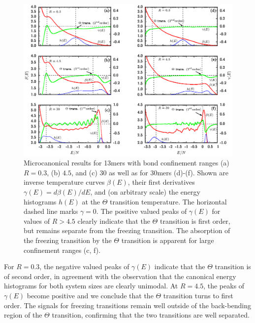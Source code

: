 \documentclass[12pt]{report}
\begin{document}
%
\begin{figure}
\center
\hspace*{-5mm}\includegraphics[width= 1.05\textwidth]{chapter5Figs/microelast.eps}
\vspace{5mm}
\caption{\label{fig:ElasPolyMicrocanonicalResults}%
Microcanonical results for 13mers with bond confinement ranges  (a) $R=0.3$, (b) $4.5$, and (c) $30$ as well as for 30mers (d)-(f). Shown are inverse temperature curves $\beta(E)$, their first derivatives $\gamma(E)=d\beta(E)/dE$, and (on arbitrary scale) the energy histograms $h(E)$ at the $\Theta$ transition temperature. The horizontal dashed line marks $\gamma=0$. The positive valued peaks of $\gamma (E)$ for values of $R > 4.5$ clearly indicate that the $\Theta$ transition is first order, but remains separate from the freezing transition. The absorption of the freezing transition by the $\Theta$ transition is apparent for large confinement ranges (c, f).}
\end{figure}
%

For $R = 0.3$, the negative valued peaks of $\gamma(E)$ indicate that the $\Theta$ transition is of second order, in agreement with the observation that the canonical energy histograms for both system sizes are clearly unimodal. At $R = 4.5$, the peaks of $\gamma(E)$ become positive and we conclude that the $\Theta$ transition turns to first order. The signals for freezing transitions remain well outside of the back-bending region of the $\Theta$ transition, confirming that the two transitions are well separated.
\end{document}
